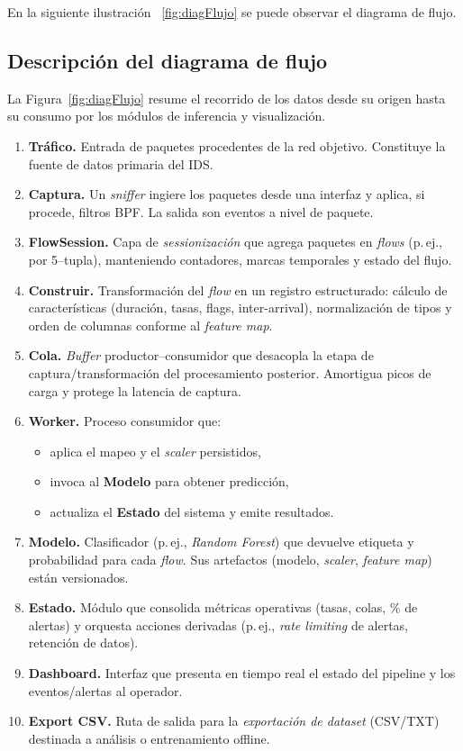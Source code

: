 En la siguiente ilustración ~\ref{fig:diagFlujo} se puede observar el diagrama de flujo.

\subsection{Descripción del diagrama de flujo}
La Figura~\ref{fig:diagFlujo} resume el recorrido de los datos desde su origen hasta su consumo por los módulos de inferencia y visualización.
\begin{enumerate}
  \item \textbf{Tráfico.} Entrada de paquetes procedentes de la red objetivo. Constituye la fuente de datos primaria del IDS.
  \item \textbf{Captura.} Un \emph{sniffer} ingiere los paquetes desde una interfaz y aplica, si procede, filtros BPF. La salida son eventos a nivel de paquete.
  \item \textbf{FlowSession.} Capa de \emph{sessionización} que agrega paquetes en \emph{flows} (p.\,ej., por 5--tupla), manteniendo contadores, marcas temporales y estado del flujo.
  \item \textbf{Construir.} Transformación del \emph{flow} en un registro estructurado: cálculo de características (duración, tasas, flags, inter-arrival), normalización de tipos y orden de columnas conforme al \emph{feature map}.
  \item \textbf{Cola.} \emph{Buffer} productor--consumidor que desacopla la etapa de captura/transformación del procesamiento posterior. Amortigua picos de carga y protege la latencia de captura.
  \item \textbf{Worker.} Proceso consumidor que:
  \begin{itemize}
    \item aplica el mapeo y el \emph{scaler} persistidos,
    \item invoca al \textbf{Modelo} para obtener predicción,
    \item actualiza el \textbf{Estado} del sistema y emite resultados.
  \end{itemize}
  \item \textbf{Modelo.} Clasificador (p.\,ej., \emph{Random Forest}) que devuelve etiqueta y probabilidad para cada \emph{flow}. Sus artefactos (modelo, \emph{scaler}, \emph{feature map}) están versionados.
  \item \textbf{Estado.} Módulo que consolida métricas operativas (tasas, colas, \% de alertas) y orquesta acciones derivadas (p.\,ej., \emph{rate limiting} de alertas, retención de datos).
  \item \textbf{Dashboard.} Interfaz que presenta en tiempo real el estado del pipeline y los eventos/alertas al operador.
  \item \textbf{Export CSV.} Ruta de salida para la \emph{exportación de dataset} (CSV/TXT) destinada a análisis o entrenamiento offline.
\end{enumerate}

